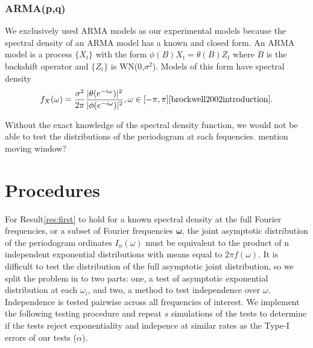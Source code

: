 \documentclass{article}\usepackage{graphicx, color}
\newcommand{\mj}[1]{{\color{blue} #1}}
\theoremstyle{plain}
\begin{document}
\subsubsection*{ARMA(p,q)}
We exclusively used ARMA models as our experimental models because the spectral density of an ARMA model has a known and closed form. An ARMA model is a process $\{X_t\}$ with the form $\phi(B)X_t = \theta(B)Z_t$ where $B$ is the backshift operator and $\{Z_t\}$ is WN(0,$\sigma^2$). Models of this form have spectral density
\begin{align}
f_X(\omega) = \frac{\sigma^2}{2\pi} \frac{|\theta(e^{-i \omega})|^2}{|\phi(e^{-i \omega})|^2}, \omega \in [-\pi, \pi] \text{\cite{brockwell2002introduction}}.
\end{align}

Without the exact knowledge of the spectral density function, we would not be able to test the distributions of the periodogram at each fequencies. \mj{mention moving window?}


\section{Procedures}

For Result\ref{res:first} to hold for a known spectral density at the full Fourier frequencies, or a subset of Fourier frequencies $\boldsymbol{\omega}$, the joint asymptotic distribution of the periodogram ordinates $I_n(\omega)$ must be equivalent to the product of n independent exponential distributions with means equal to $2\pi f(\omega)$. It is difficult to test the distribution of the full asymptotic joint distribution, so we split the problem in to two parts: one, a test of asymptotic exponential distribution at each $\omega_i$, and two, a method to test independence over $\omega$. Independence is tested pairwise across all frequencies of interest. We implement the following testing procedure and repeat $s$ simulations of the tests to determine if the tests reject exponentiality and indepence at similar rates as the Type-I errors of our tests ($\alpha$).
\end{document}
